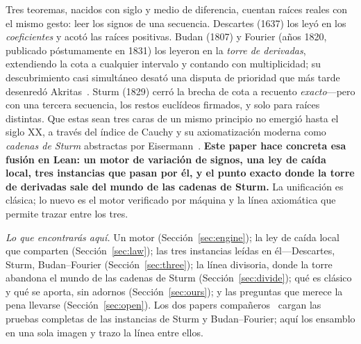 \documentclass[11pt]{article}
\begin{document}
\medskip
\noindent Tres teoremas, nacidos con siglo y medio de diferencia, cuentan ra\'ices reales con el mismo
gesto: leer los signos de una secuencia. Descartes (1637) los ley\'o en los \emph{coeficientes} y acot\'o
las ra\'ices positivas. Budan (1807) y Fourier (a\~nos 1820, publicado p\'ostumamente en 1831) los
leyeron en la \emph{torre de derivadas}, extendiendo la cota a cualquier intervalo y contando con
multiplicidad; su descubrimiento casi simult\'aneo desat\'o una disputa de prioridad que m\'as tarde
desenred\'o Akritas~\cite{akritas}. Sturm (1829) cerr\'o la brecha de cota a recuento \emph{exacto}---pero
con una tercera secuencia, los restos eucl\'ideos firmados, y solo para ra\'ices distintas. Que estas
sean tres caras de un mismo principio no emergi\'o hasta el siglo XX, a trav\'es del \'indice de Cauchy
y su axiomatizaci\'on moderna como \emph{cadenas de Sturm} abstractas por Eisermann~\cite{eisermann}.
\textbf{Este paper hace concreta esa fusi\'on en Lean: un motor de variaci\'on de signos, una ley de
ca\'ida local, tres instancias que pasan por \'el, y el punto exacto donde la torre de derivadas sale
del mundo de las cadenas de Sturm.} La unificaci\'on es cl\'asica; lo nuevo es el motor verificado por
m\'aquina y la l\'inea axiom\'atica que permite trazar entre los tres.

\medskip
\noindent\emph{Lo que encontrar\'as aqu\'i.} Un motor (Secci\'on~\ref{sec:engine}); la ley de ca\'ida
local que comparten (Secci\'on~\ref{sec:law}); las tres instancias le\'idas en \'el---Descartes, Sturm,
Budan--Fourier (Secci\'on~\ref{sec:three}); la l\'inea divisoria, donde la torre abandona el mundo de
las cadenas de Sturm (Secci\'on~\ref{sec:divide}); qu\'e es cl\'asico y qu\'e se aporta, sin adornos
(Secci\'on~\ref{sec:ours}); y las preguntas que merece la pena llevarse (Secci\'on~\ref{sec:open}). Los
dos papers compa\~neros~\cite{sturmlean,budanlean} cargan las pruebas completas de las instancias de
Sturm y Budan--Fourier; aqu\'i los ensamblo en una sola imagen y trazo la l\'inea entre ellos.
\end{document}
